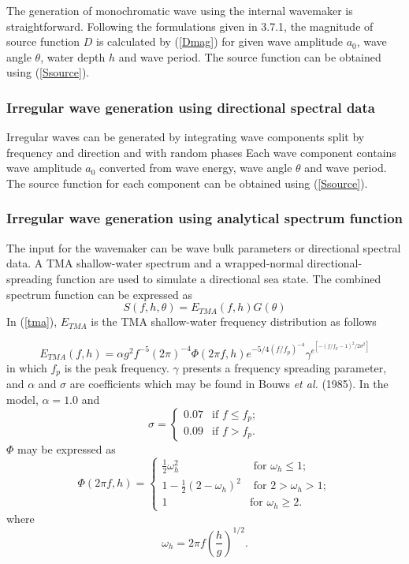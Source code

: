 \documentclass[11pt]{article}
\newcommand{\be}{\begin{equation}}
\newcommand{\ee}{\end{equation}}
\begin{document}
The generation of monochromatic wave using the internal wavemaker is straightforward. Following the formulations given in 3.7.1, the magnitude of source function $D$ is calculated by (\ref{Dmag}) for given wave amplitude $a_0$, wave angle $\theta$, water depth $h$ and wave period. The source function can be obtained using (\ref{Ssource}). 


\subsubsection{Irregular wave generation using directional spectral data}

Irregular waves can be generated 
by integrating wave components split by frequency and direction and with random phases Each wave component contains wave amplitude $a_0$ converted from wave energy, wave angle $\theta$ and wave period. The source function for each component can be obtained using (\ref{Ssource}). 


\subsubsection{Irregular wave generation using analytical spectrum function}

The input for the wavemaker can be wave bulk parameters or directional spectral data. A TMA shallow-water spectrum and a wrapped-normal directional-spreading function are used to simulate a directional sea state. The combined spectrum function can be expressed as
\be
S(f,h,\theta) = E_{TMA}(f,h) G(\theta)
\label{tma}
\ee
In (\ref{tma}), $E_{TMA}$ is the TMA shallow-water frequency distribution as follows

\be
E_{TMA} (f,h) = \alpha g^2 f^{-5} (2 \pi)^{-4} \Phi (2\pi f, h)
e^{-5/4(f/f_p)^{-4}} \gamma^{e^{[-(f/f_p -1)^2 /2\sigma^2]}} 
\label{Etma}
\ee
in which $f_p$ is the peak frequency.  $\gamma$ presents a frequency
spreading parameter, and $\alpha$ and $\sigma$ are coefficients which
may be found in Bouws {\em et al.} (1985).  In the model,  $\alpha = 1.0$ and 
$$
\sigma = \left\{ \begin{array}{ll}
 0.07 & \mbox{if $f \leq f_p$}; \\
0.09  & \mbox{if $f > f_p$}. \end{array} \right.
$$
$\Phi$ may be expressed as
$$
\Phi (2 \pi f, h) = \left\{ \begin{array}{ll}
\frac{1}{2} \omega_h^2 & \mbox{ for $\omega_h \leq 1$}; \\
1-\frac{1}{2}(2-\omega_h)^2 & \mbox{ for $2 > \omega_h >1$};\\
1 & \mbox{for $\omega_h \geq 2$}.
\end{array} \right.
\label{phi}
$$
where 
$$
\omega_h = 2 \pi f (\frac{h}{g})^{1/2}.
$$
\end{document}

